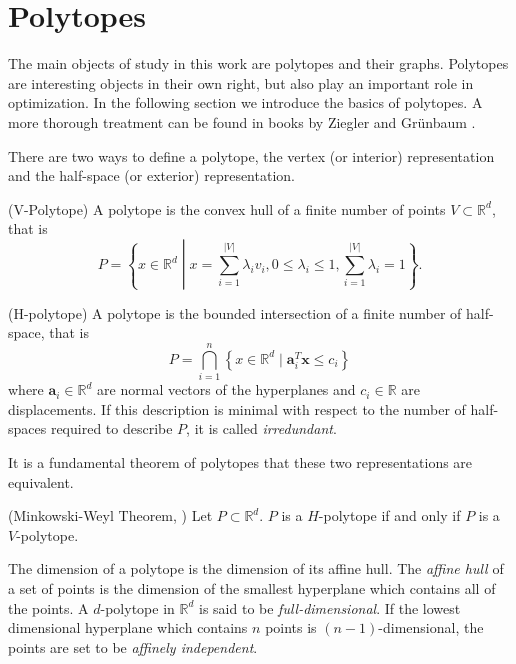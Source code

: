 \section{Polytopes}

The main objects of study in this work are polytopes and their graphs. Polytopes are 
interesting 
objects in their own right, but also play an important role in
optimization. In the following section we introduce the basics of polytopes. 
A more thorough treatment can be found in books by Ziegler \cite{PolyLec} 
and Gr\"unbaum \cite{Grunbaum69convexpolytopes}. 

There are 
two ways to define a polytope, the vertex (or interior) representation and the 
half-space (or exterior) representation.

\begin{definition}
(V-Polytope) A polytope is the convex hull of a finite number of points $V 
\subset \mathbb{R}^d$, that is 
\begin{equation}
 P = \left\{x\in \mathbb{R}^d \middle| x = \sum_{i=1}^{|V|} \lambda_i v_i, 
0\leq \lambda_i \leq 1, \sum_{i=1}^{|V|} \lambda_i = 1 \right\}.
\end{equation}

\end{definition}

\begin{definition}
 (H-polytope) A polytope is the bounded intersection of a finite number of 
half-space, that is
\begin{equation}
 P = \bigcap_{i=1}^n \left\{x \in \mathbb{R}^d \mid \mathbf{a}_i^T \mathbf{x} 
\leq 
c_i \right\}
\end{equation}
where $\mathbf{a}_i \in \mathbb{R}^d$ are normal vectors of the hyperplanes and 
$c_i \in 
\mathbb{R}$ are displacements. If this description is minimal with respect to 
the number of half-spaces required to describe $P$, it is called 
\textit{irredundant}.
\end{definition}

It is a fundamental theorem of polytopes that these two representations are 
equivalent.
\begin{theorem}
(Minkowski-Weyl Theorem, \cite[Thm. 1.1.]{PolyLec}) Let $P \subset \mathbb{R}^d$. 
$P$ is a $H$-polytope if and only if $P$ is a $V$-polytope.
\end{theorem}
The dimension of a polytope is the dimension of its affine hull. The \textit{affine 
hull} of a set of points is the dimension of the smallest hyperplane which 
contains all of the points. A $d$-polytope in $\mathbb{R}^d$ is said to be 
\textit{full-dimensional}. If the lowest dimensional hyperplane which contains 
$n$ points is $(n-1)$-dimensional, the points are set to be \textit{affinely 
independent}.


